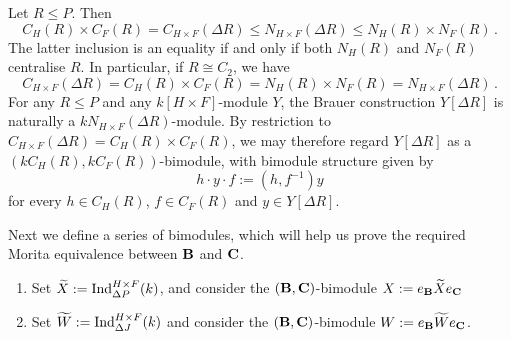 \begin{rem}\label{rem:diagonal-normalizers-3A6} Let $R\le P$. Then
\[
C_H(R)\times C_F(R)=C_{H\times F}(\Delta R)
\leq 
N_{H\times F}(\Delta R)
\leq N_H(R)\times N_F(R)\,.
\]
The latter inclusion is an equality if and only if both $N_H(R)$ and $N_F(R)$ centralise $R$. In particular, if $R\cong C_2$, we have 
\[
C_{H\times F}(\Delta R)=C_H(R)\times C_F(R)=N_H(R)\times N_F(R)=N_{H\times F}(\Delta R)\,.
\]
For any $R\leq P$ and any $k[H\times F]$-module $Y$, the Brauer
construction $Y[\Delta R]$ is naturally a
$kN_{H\times F}(\Delta R)$-module. By restriction to $C_{H\times F}(\Delta R)=C_H(R)\times C_F(R)$, we may therefore regard $Y[\Delta R]$ as a
$(kC_H(R),kC_F(R))$-bimodule, with bimodule structure given by
\[
h\cdot y\cdot f:=(h,f^{-1})y
\]
for every $h\in C_H(R)$, $f\in C_F(R)$ and $y\in Y[\Delta R]$.
\end{rem}


\noindent Next we define a series of bimodules, which will help us prove the required Morita equivalence between ${\mathbf{B}}$ and ${\mathbf{C}}$.    


\begin{nota}\leavevmode
\begin{enumerate}[label=(\arabic*),start=16]
   \item Set  $\widetilde{X}:=\operatorname{Ind}_{\Delta P}^{H\times F}(k)$, and consider the $({\mathbf{B}},{\mathbf{C}})$-bimodule $X:=e_{{\mathbf{B}}}\widetilde{X}e_{{\mathbf{C}}}$ 
   \item  Set $\widetilde{W}:=\operatorname{Ind}^{H\times F}_{\Delta J}(k)$ and  consider the $({\mathbf{B}},{\mathbf{C}})$-bimodule $W:=e_{\mathbf{B}} \widetilde{W} e_{{\mathbf{C}}}$.
\end{enumerate}    
\end{nota}

